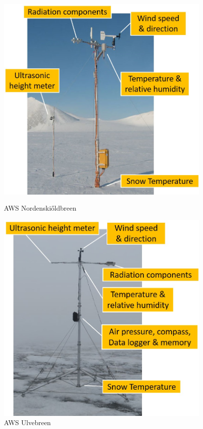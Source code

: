 \documentclass[11pt]{report}
\begin{document}
\begin{figure}[h]
\raggedright
\begin{minipage}{0.5\textwidth}
\centering{}
    \includegraphics[width=0.95\textwidth]{nski1.jpg}
    \caption{AWS Nordenski\H{o}ldbreen \cite{uuproj}}
    \label{fig:instrn}
\end{minipage}%
\begin{minipage}{0.5\textwidth}
\centering{}
    \includegraphics[width=0.95\textwidth]{ulve1.jpg}
    \caption{AWS Ulvebreen \cite{uuproj}}
    \label{fig:instru}
\end{minipage}%
\end{figure}
\end{document}
